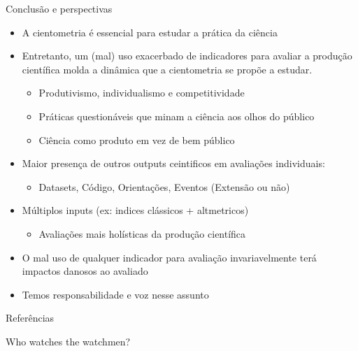 \documentclass[bigger]{beamer}
\begin{document}
\begin{frame}[label={sec:org695d1ed}]{Conclusão e perspectivas}
\begin{itemize}
\item A cientometria é essencial para estudar a prática da ciência
\item Entretanto, um (mal) uso exacerbado de indicadores para avaliar a produção científica molda a dinâmica que a cientometria se propõe a estudar.
\begin{itemize}
\item Produtivismo, individualismo e competitividade
\item Práticas questionáveis que minam a ciência aos olhos do público
\item Ciência como produto em vez de bem público
\end{itemize}
\item Maior presença de outros outputs ceintificos em avaliações individuais:
\begin{itemize}
\item Datasets, Código, Orientações, Eventos (Extensão ou não)
\end{itemize}
\item Múltiplos inputs (ex: indices clássicos + altmetricos)
\begin{itemize}
\item Avaliações mais holísticas da produção científica
\end{itemize}
\item O \alert{mal uso} de qualquer indicador para avaliação invariavelmente terá impactos danosos ao avaliado
\item Temos responsabilidade e voz nesse assunto
\end{itemize}
\end{frame}


\begin{frame}[fragile,allowframebreaks,label=]{Referências}
\printbibliography
\end{frame}

\begin{frame}[label={sec:orge37773f}]{Who watches the watchmen?}
\end{frame}
\end{document}
